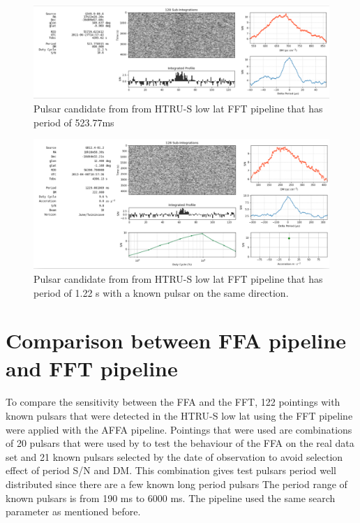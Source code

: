 \documentclass[thesis_msc.tex]{subfiles}
\begin{document}
\begin{figure}[h]
\centering
\includegraphics[width=1.0\textwidth]{figures/C1.png}
\caption{Pulsar candidate from from HTRU-S low lat FFT pipeline that has period of 523.77ms }\label{C1}
\end{figure}
 
 \begin{figure}[h]
\centering
\includegraphics[width=1.0\textwidth]{figures/C2.png}
\caption{Pulsar candidate from from HTRU-S low lat FFT pipeline that has period of 1.22 s with a known pulsar on the same direction.}\label{C2}
\end{figure}
    
\section{Comparison between FFA pipeline and FFT pipeline }
    \paragraph{} To compare the sensitivity between the FFA and the FFT, 122 pointings with known pulsars that were detected in the HTRU-S low lat using the FFT pipeline were applied with the AFFA pipeline. Pointings that were used are combinations of 20 pulsars that were used by \citep{cameron2017investigation} to test the behaviour of the FFA on the real data set and 21 known pulsars selected by the date of observation to avoid selection effect of period S/N and DM. This combination gives test pulsars period well distributed since there are a few known long period pulsars %
    The period range of known pulsars is from 190 ms to 6000 ms. The pipeline used the same search parameter as mentioned before. 
\end{document}
